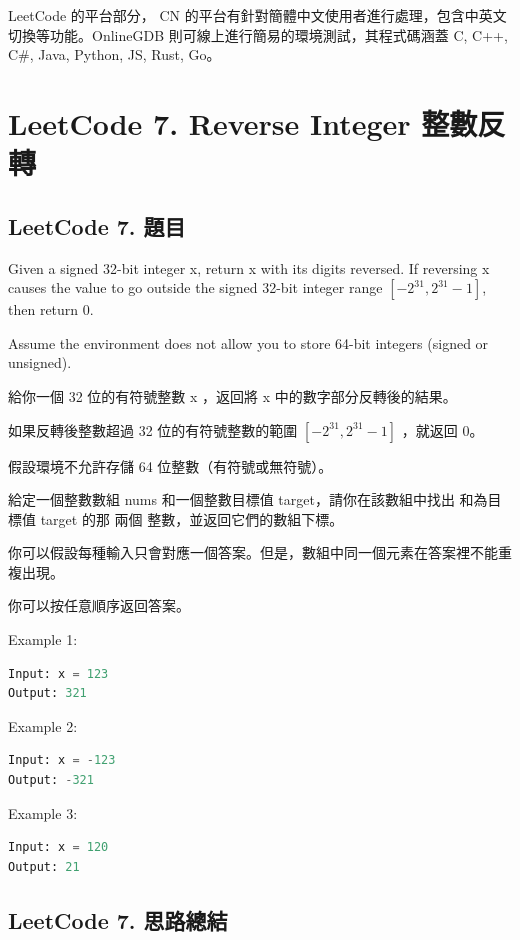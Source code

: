 \documentclass[10pt,UTF8]{ctexart}
\begin{document}
LeetCode 的平台部分， CN 的平台有針對簡體中文使用者進行處理，包含中英文切換等功能。OnlineGDB 則可線上進行簡易的環境測試，其程式碼涵蓋 C, C++, C\#, Java, Python, JS, Rust, Go。

\newpage

\section{LeetCode 7. Reverse Integer 整數反轉}

\subsection{LeetCode 7. 題目}

Given a signed 32-bit integer x, return x with its digits reversed. If reversing x causes the value to go outside the signed 32-bit integer range $[-2^{31}, 2^{31} - 1]$, then return 0.

Assume the environment does not allow you to store 64-bit integers (signed or unsigned).


給你一個 32 位的有符號整數 x ，返回將 x 中的數字部分反轉後的結果。

如果反轉後整數超過 32 位的有符號整數的範圍 $[−2^{31}, 2^{31} − 1]$ ，就返回 0。

假設環境不允許存儲 64 位整數（有符號或無符號）。

給定一個整數數組 nums 和一個整數目標值 target，請你在該數組中找出 和為目標值 target  的那 兩個 整數，並返回它們的數組下標。

你可以假設每種輸入只會對應一個答案。但是，數組中同一個元素在答案裡不能重複出現。

你可以按任意順序返回答案。

Example 1:
\begin{lstlisting}[language={python}]
Input: x = 123
Output: 321
\end{lstlisting}

Example 2:
\begin{lstlisting}[language={python}]
Input: x = -123
Output: -321
\end{lstlisting}

Example 3:
\begin{lstlisting}[language={python}]
Input: x = 120
Output: 21
\end{lstlisting}

\subsection{LeetCode 7. 思路總結}
\end{document}

